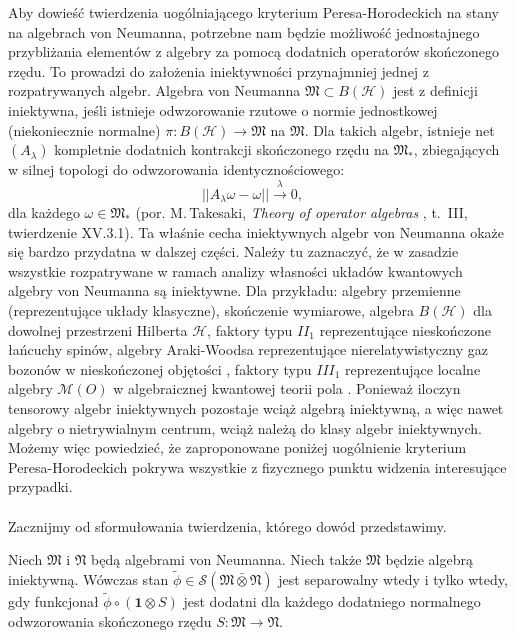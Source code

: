 Aby dowieść twierdzenia uogólniającego kryterium Peresa-Horodeckich
na stany na algebrach von Neumanna,
potrzebne nam będzie możliwość jednostajnego przybliżania elementów z algebry
za pomocą dodatnich operatorów skończonego rzędu.
To prowadzi do założenia iniektywności przynajmniej jednej z rozpatrywanych algebr.
Algebra von Neumanna $\mathfrak{M}\subset B(\mathcal{H})$ jest z definicji iniektywna,
jeśli istnieje odwzorowanie rzutowe o normie jednostkowej (niekoniecznie normalne)
$\pi :B(\mathcal{H})\to\mathfrak{M}$ na $\mathfrak{M}$.
Dla takich algebr, istnieje net $(A_{\lambda})$ kompletnie dodatnich
kontrakcji skończonego rzędu na  $\mathfrak{M}_*$,
zbiegających w silnej topologi do odwzorowania identycznościowego:
\begin{equation}
\label{RandomLabel:513684}
 || A_{\lambda} \omega - \omega || \stackrel{\lambda}{\longrightarrow} 0, \quad
\end{equation}
dla każdego $\omega \in \mathfrak{M}_{*}$
(por. M.\,Takesaki, \emph{Theory of operator algebras}  \cite{Takesaki3},
\mbox{t. III}, twierdzenie XV.3.1).
Ta właśnie cecha iniektywnych algebr von Neumanna okaże się bardzo przydatna
w dalszej części.
Należy tu zaznaczyć, że w zasadzie wszystkie rozpatrywane w ramach analizy
własności układów kwantowych algebry von Neumanna są iniektywne.
Dla przykładu: algebry przemienne (reprezentujące układy klasyczne),
skończenie wymiarowe,
algebra $B(\mathcal{H})$ dla dowolnej przestrzeni Hilberta $\mathcal{H}$,
faktory typu $II_1$ reprezentujące nieskończone łańcuchy spinów,
algebry Araki-Woodsa reprezentujące nierelatywistyczny gaz bozonów w nieskończonej objętości
\cite{araki1968classification},
faktory typu $III_1$ reprezentujące localne algebry $\mathcal{M}(O)$
w algebraicznej kwantowej teorii pola \cite{yngwason2005role}.
Ponieważ iloczyn tensorowy algebr iniektywnych pozostaje wciąż algebrą iniektywną,
a więc nawet algebry o nietrywialnym centrum, wciąż należą do klasy algebr iniektywnych.
Możemy więc powiedzieć, że zaproponowane poniżej uogólnienie kryterium Peresa-Horodeckich
pokrywa wszystkie z fizycznego punktu widzenia interesujące przypadki.

\paragraph{}
Zacznijmy od sformułowania twierdzenia, którego dowód przedstawimy.

\begin{Theorem}
    \label{thm:PHcrit}
    Niech $\mathfrak{M}$ i  $\mathfrak{N}$ będą algebrami von Neumanna.
    Niech także  $\mathfrak{M}$ będzie algebrą iniektywną.
    Wówczas stan $\tilde{\phi} \in \mathcal{S}(\mathfrak{M} \bar{\otimes} \mathfrak{N})$
    jest separowalny wtedy i tylko wtedy, gdy funkcjonał
    $\tilde{\phi} \circ (\mathbf{1} \otimes S)$
    jest dodatni dla każdego dodatniego normalnego odwzorowania skończonego rzędu
    $S\!: \mathfrak{M} \rightarrow \mathfrak{N}$.
\end{Theorem}

